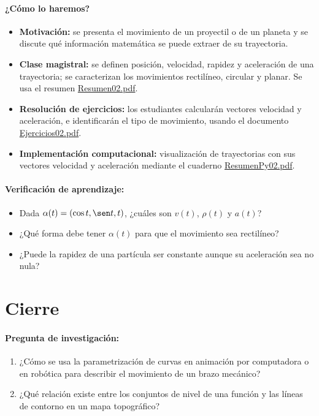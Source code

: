 \documentclass[a4,11pt]{aleph-notas}
\begin{document}
\paragraph{¿Cómo lo haremos?}
\begin{itemize}[leftmargin=*]
    \item \textbf{Motivación:} se presenta el movimiento de un proyectil o de un planeta y se discute qué información matemática se puede extraer de su trayectoria.
    \item \textbf{Clase magistral:} se definen posición, velocidad, rapidez y aceleración de una trayectoria; se caracterizan los movimientos rectilíneo, circular y planar. Se usa el resumen \href{https://andres-merino.github.io/MatematicaIII-05-N0051/01Resumen/Resumen02.pdf}{Resumen02.pdf}.
    \item \textbf{Resolución de ejercicios:} los estudiantes calcularán vectores velocidad y aceleración, e identificarán el tipo de movimiento, usando el documento \href{https://andres-merino.github.io/MatematicaIII-05-N0051/04Ejercicios/Ejercicios02.pdf}{Ejercicios02.pdf}.
    \item \textbf{Implementación computacional:} visualización de trayectorias con sus vectores velocidad y aceleración mediante el cuaderno \href{https://andres-merino.github.io/MatematicaIII-05-N0051/02ResumenPython/ResumenPy02.pdf}{ResumenPy02.pdf}.
\end{itemize}

\paragraph{Verificación de aprendizaje:}
\begin{itemize}[leftmargin=*]
    \item Dada $\alpha(t)=(\cos t, \sen t, t)$, ¿cuáles son $v(t)$, $\rho(t)$ y $a(t)$?
    \item ¿Qué forma debe tener $\alpha(t)$ para que el movimiento sea rectilíneo?
    \item ¿Puede la rapidez de una partícula ser constante aunque su aceleración sea no nula?
\end{itemize}

\section*{Cierre}

\paragraph{Pregunta de investigación:}
\begin{enumerate}[leftmargin=*]
    \item ¿Cómo se usa la parametrización de curvas en animación por computadora o en robótica para describir el movimiento de un brazo mecánico?
    \item ¿Qué relación existe entre los conjuntos de nivel de una función y las líneas de contorno en un mapa topográfico?
\end{enumerate}
\end{document}
